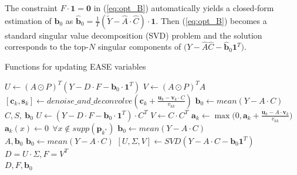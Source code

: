 \documentclass[10pt,letterpaper]{article}
\begin{document}
{The constraint $ F\cdot \bm{1} = \bm{0}$ in (\ref{eq:opt_B}) automatically yields a closed-form estimation of $\bm{b}_0$ as  $\hat{\bm{b}}_0=\frac{1}{T}(\tilde{Y}-\hat{A}\cdot \hat{C})\cdot \bm{1}$. Then (\ref{eq:opt_B})  becomes a standard singular value decomposition (SVD) problem and the solution corresponds to the top-$N$ singular components of $\big(Y-\hat{A}\hat{C}-\hat{\bm{b}}_0\bm{1}^T\big)$. 

\begin{algorithm}[t!]
\caption{Functions for updating EASE variables}\label{alg:opt_ABC}
\begin{algorithmic}[1]
\State $U \leftarrow (A\odot P)^T(Y - D\cdot F -\bm{b}_0\cdot \bm{1}^T)$ 
\State $V \leftarrow (A\odot P)^TA$
 
 
\State $[\bm{c}_k, \bm{s}_k] \leftarrow denoise\_and\_deconvolve(\bm{c}_k+ \frac{\bm{u}_k-\bm{v}_k\cdot C}{v_{kk}})$ 
\EndFor
\EndFor
\State $\bm{b}_0 \leftarrow mean(Y-A\cdot C) $  \\
\Return $C, S, ~\bm{b}_0$
\EndFunction
\State 
{}
\State $ U \leftarrow (Y - D\cdot F -\bm{b}_0\cdot \bm{1}^T)\cdot C^T$ 
\State $V \leftarrow C\cdot C^T$
 
 
\State $\bm{a}_k\leftarrow \max\big(0, \bm{a}_k+ \frac{\bm{u}_k-A\cdot\bm{v}_k}{v_{kk}}\big)$ \ 
\State $\bm{a}_k(x) \leftarrow 0 ~~ \forall x\notin supp(\bm{p}_{k^*})$ 
\EndFor
\EndFor
\State $\bm{b}_0 \leftarrow mean(Y-A\cdot C) $  \\
\Return $A, \bm{b}_0$
\EndFunction
\State 
{}
\State $\bm{b}_0 \leftarrow mean(Y-A\cdot C) $  
\State $[U, \Sigma, V] \leftarrow SVD(Y-A\cdot C-\bm{b}_0\bm{1}^T)$
\State $D=U\cdot \Sigma, F = V^T$\\
\Return $D, F, \bm{b}_0$
\EndFunction


\end{algorithmic}
\end{algorithm}}
\end{document}
